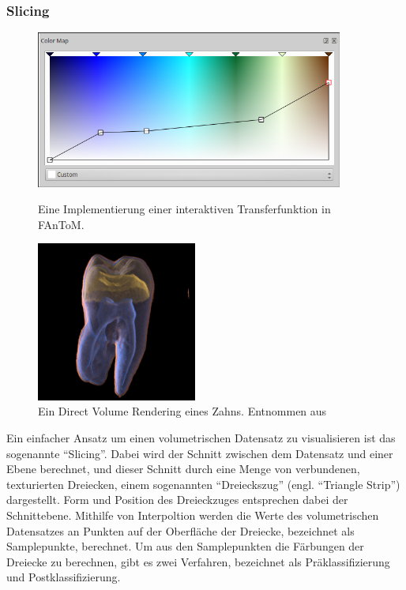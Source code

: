 \documentclass[a4paper,fontsize=12pt,toc=bib,halfparskip]{scrartcl}
\begin{document}
\subsubsection{Slicing}
\label{section:Slicing}
\begin{figure}
	\begin{minipage}{0.5\textwidth}
		\centering
		\includegraphics[width=0.9\textwidth]{pictures/Colormap.png}
		\caption{Eine Implementierung einer interaktiven Transferfunktion in FAnToM.} 
		\label{Colormap}
	\end{minipage}
	\hspace{0.5cm}
	\begin{minipage}{0.5\textwidth}
		\centering
		\includegraphics[width=0.47\textwidth]{pictures/Zahn.png}
		\caption{Ein Direct Volume Rendering eines Zahns. Entnommen aus \cite[S.~6]{drebin1988volume}}
		\label{Zahn}
	\end{minipage}
\end{figure}
Ein einfacher Ansatz um einen volumetrischen Datensatz zu visualisieren ist das sogenannte ``Slicing''\cite{munzner2014visualization}. Dabei wird der Schnitt zwischen dem Datensatz und einer Ebene berechnet, und dieser Schnitt durch eine Menge von verbundenen, texturierten Dreiecken, einem sogenannten ``Dreieckszug'' (engl. ``Triangle Strip'') dargestellt. Form und Position des Dreieckzuges entsprechen dabei der Schnittebene. Mithilfe von Interpoltion werden die Werte des volumetrischen Datensatzes an Punkten auf der Oberfl\"ache der Dreiecke, bezeichnet als Samplepunkte, berechnet. Um aus den Samplepunkten die F\"arbungen der Dreiecke zu berechnen, gibt es zwei Verfahren, bezeichnet als Pr\"aklassifizierung und Postklassifizierung.
\end{document}
